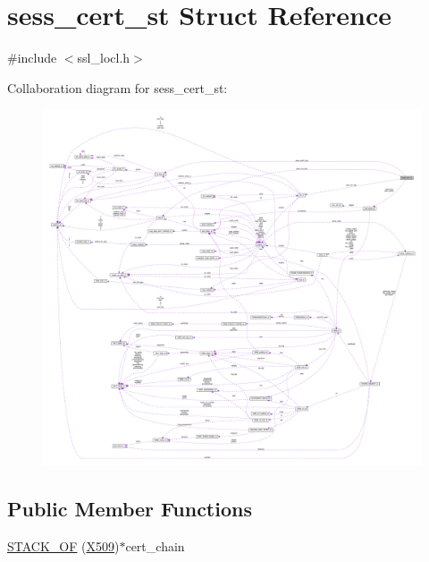 \hypertarget{structsess__cert__st}{}\section{sess\+\_\+cert\+\_\+st Struct Reference}
\label{structsess__cert__st}


{\ttfamily \#include $<$ssl\+\_\+locl.\+h$>$}



Collaboration diagram for sess\+\_\+cert\+\_\+st\+:\nopagebreak
\begin{figure}[H]
\begin{center}
\leavevmode
\includegraphics[width=350pt]{structsess__cert__st__coll__graph}
\end{center}
\end{figure}
\subsection*{Public Member Functions}
\begin{DoxyCompactItemize}
\item 
\hyperlink{structsess__cert__st_a33151ecfb2b2675a01299614ba39a876}{S\+T\+A\+C\+K\+\_\+\+OF} (\hyperlink{crypto_2ossl__typ_8h_a4f666bde6518f95deb3050c54b408416}{X509})$\ast$cert\+\_\+chain
\end{DoxyCompactItemize}
